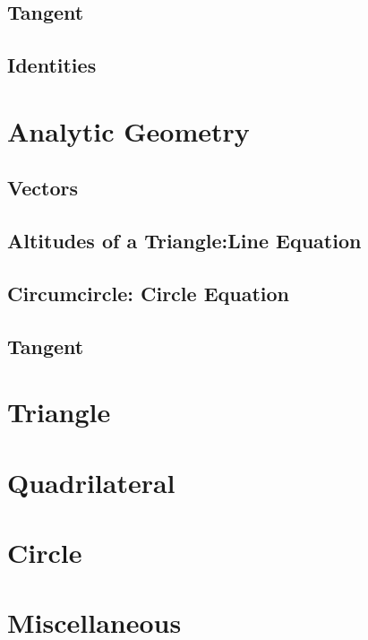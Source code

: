 \documentclass[11pt]{book}
\begin{document}
\section{Tangent}

\section{Identities}

\chapter{Analytic Geometry}
\section{Vectors}

\section{Altitudes of a Triangle:Line Equation}

\section{Circumcircle: Circle Equation}

\section{Tangent}

\chapter{Triangle}

\chapter{Quadrilateral}

%
\chapter{Circle}

\chapter{Miscellaneous }

\iffalse
% 
\backmatter
\appendix
\chapter{Area of a Circle}

\fi
%
%
\end{document}
